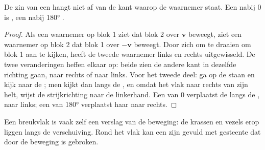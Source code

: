 \begin{proposition}\label{prop:b1:faults-folds-fabrics:sense}
De zin van een  hangt niet af van de kant waarop de waarnemer staat. Een  nabij $0$ is , een  nabij \ang{180} .
\end{proposition}

\begin{proof}
Als een waarnemer op blok 1 ziet dat blok 2 over $\mathbf v$ beweegt, ziet een waarnemer op blok 2 dat blok 1 over $-\mathbf v$ beweegt. Door zich om te draaien om blok 1 aan te kijken, heeft de tweede waarnemer links en rechts uitgewisseld. De twee veranderingen heffen elkaar op: beide zien de andere kant in dezelfde richting gaan, naar rechts of naar links. Voor het tweede deel: ga op de  staan en kijk naar de ; men kijkt dan langs de , en omdat het vlak naar rechts van zijn  helt, wijst de strijkrichting naar de linkerhand. Een  van $0$ verplaatst de  langs de , naar links; een  van \ang{180} verplaatst haar naar rechts.
\end{proof}

Een breukvlak is vaak zelf een verslag van de beweging: de krassen en vezels erop liggen langs de verschuiving. Rond het vlak kan een  zijn gevuld met gesteente dat door de beweging is gebroken.

